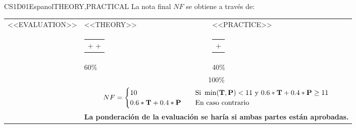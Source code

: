   \begin{evaluation}{CS1D01}{Espanol}{THEORY,PRACTICAL}
  La nota final $NF$ se obtiene a través de:

  \begin{tabularx}{0.9\textwidth}{|X|p{}|p{}|} \hline
  \multirow{4}{*}{\uppercase{<<Evaluation>>}} & \uppercase{<<Theory>>} & \uppercase{<<Practice>>} \\ \cline{2-3}
  & %
      \begin{minipage}{0.95\textwidth}
      \begin{tabular}{l}
          $\text{\textbf{T}} = [<<ExamAcronym>>_{1}$  +
          $<<ExamAcronym>>_{2}$  +
          $<<ExamAcronym>>_{3}]/3$
          \end{tabular}
      \end{minipage}
  & %
      \begin{minipage}{0.95\textwidth}
      \begin{tabular}{l}
          $\text{\textbf{P}} = [<<ContinuousAssessmentAcronym>>_{1}$ +
          $<<ContinuousAssessmentAcronym>>_{2}]/2$
      \end{tabular}
      \end{minipage}                 \\ \cline{2-3}

  & %
  60\% 
  & %
  40\% \\ \cline{2-3}
  & \multicolumn{2}{c|}{100\%}  \\ \cline{2-3}
  & \multicolumn{2}{c|}{
    \begin{math}
      NF =
      \begin{cases}
        10     & \quad \text{Si } \min(\text{\textbf{T}},\text{\textbf{P}}) < 11 \text{ y } 0.6*\text{\textbf{T}} + 0.4*\text{\textbf{P}} \geq 11 \\
        0.6*\text{\textbf{T}} + 0.4*\text{\textbf{P}}  & \quad \text{En caso contrario}
      \end{cases}
    \end{math}
  } \\ \cline{2-3}
  & \multicolumn{2}{c|}{\textbf{La ponderación de la evaluación se haría si ambas partes están aprobadas.}}  \\ \hline
  \end{tabularx}


\end{evaluation}
